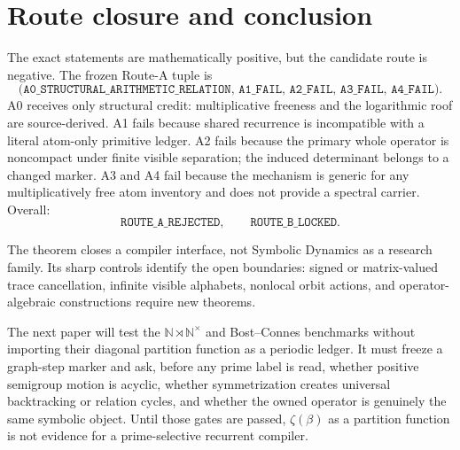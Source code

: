 \section{Route closure and conclusion}

The exact statements are mathematically positive, but the candidate route is
negative.  The frozen Route-A tuple is
\[
\texttt{(A0\_STRUCTURAL\_ARITHMETIC\_RELATION,
A1\_FAIL, A2\_FAIL, A3\_FAIL, A4\_FAIL)}.
\]
A0 receives only structural credit: multiplicative freeness and the
logarithmic roof are source-derived.  A1 fails because shared recurrence is
incompatible with a literal atom-only primitive ledger.  A2 fails because
the primary whole operator is noncompact under finite visible separation;
the induced determinant belongs to a changed marker.  A3 and A4 fail because
the mechanism is generic for any multiplicatively free atom inventory and
does not provide a spectral carrier.  Overall:
\[
\texttt{ROUTE\_A\_REJECTED},\qquad
\texttt{ROUTE\_B\_LOCKED}.
\]

The theorem closes a compiler interface, not Symbolic Dynamics as a research
family.  Its sharp controls identify the open boundaries: signed or
matrix-valued trace cancellation, infinite visible alphabets, nonlocal orbit
actions, and operator-algebraic constructions require new theorems.

The next paper will test the $\mathbb N\rtimes\mathbb N^\times$ and
Bost--Connes benchmarks without importing their diagonal partition function
as a periodic ledger.  It must freeze a graph-step marker and ask, before any
prime label is read, whether positive semigroup motion is acyclic, whether
symmetrization creates universal backtracking or relation cycles, and whether
the owned operator is genuinely the same symbolic object.  Until those gates
are passed, $\zeta(\beta)$ as a partition function is not evidence for a
prime-selective recurrent compiler.
